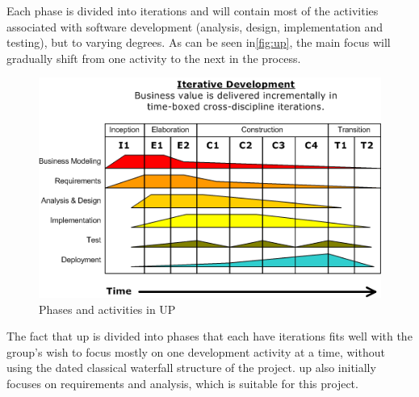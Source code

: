 Each phase is divided into iterations and will contain most of the activities associated with software development (analysis, design, implementation and testing), but to varying degrees. As can be seen in\autoref{fig:up}, the main focus will gradually shift from one activity to the next in the process.

\begin{figure}[h]
  \centering
    \includegraphics[width=\textwidth]{img/Development-iterative.png}
  \caption{Phases and activities in UP}
  \label{fig:up}
\end{figure}


The fact that \ac{up} is divided into phases that each have iterations fits well with the group's wish to focus mostly on one development activity at a time, without using the dated classical waterfall structure of the project.
\ac{up} also initially focuses on requirements and analysis, which is suitable for this project.\newline

